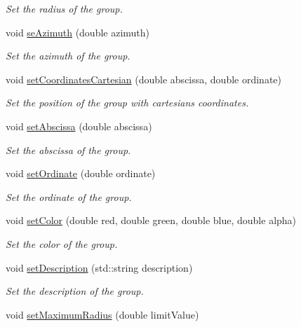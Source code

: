 \begin{DoxyCompactItemize}
\begin{DoxyCompactList}\small\item\em Set the radius of the group. \end{DoxyCompactList}\item 
void \hyperlink{class_hoa2_d_1_1_sources_group_a8c9b40858bd5621785623d9e9280fd64}{se\-Azimuth} (double azimuth)
\begin{DoxyCompactList}\small\item\em Set the azimuth of the group. \end{DoxyCompactList}\item 
void \hyperlink{class_hoa2_d_1_1_sources_group_a0acf628f87d00faf379937f6e5537d48}{set\-Coordinates\-Cartesian} (double abscissa, double ordinate)
\begin{DoxyCompactList}\small\item\em Set the position of the group with cartesians coordinates. \end{DoxyCompactList}\item 
void \hyperlink{class_hoa2_d_1_1_sources_group_a28c6582846072ee72b0d0b9d245ed01a}{set\-Abscissa} (double abscissa)
\begin{DoxyCompactList}\small\item\em Set the abscissa of the group. \end{DoxyCompactList}\item 
void \hyperlink{class_hoa2_d_1_1_sources_group_a2958271bde3b47a8e7b5d2bec59090df}{set\-Ordinate} (double ordinate)
\begin{DoxyCompactList}\small\item\em Set the ordinate of the group. \end{DoxyCompactList}\item 
void \hyperlink{class_hoa2_d_1_1_sources_group_ac86608cb4d89d5985adcec0264dae6af}{set\-Color} (double red, double green, double blue, double alpha)
\begin{DoxyCompactList}\small\item\em Set the color of the group. \end{DoxyCompactList}\item 
void \hyperlink{class_hoa2_d_1_1_sources_group_af355a422f3b78917b9ee998d1278c3c4}{set\-Description} (std\-::string description)
\begin{DoxyCompactList}\small\item\em Set the description of the group. \end{DoxyCompactList}\item 
void \hyperlink{class_hoa2_d_1_1_sources_group_aa3aa1ea33e8ae9277803f878c165ee80}{set\-Maximum\-Radius} (double limit\-Value)

\end{DoxyCompactItemize}
